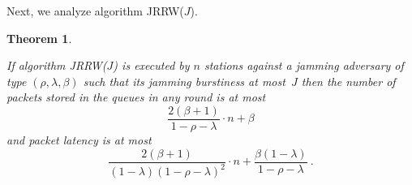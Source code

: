 \documentclass[11pt]{article}
\newtheorem{theorem}{Theorem}
\begin{document}
Next, we analyze algorithm \textsc{JRRW}($J$).


\begin{theorem}
\label{thm:JRRW(J)-jamming}

If algorithm \textsc{JRRW($J$)} is executed by $n$ stations against a jamming adversary of type $(\rho,\lambda,\beta)$ such that its jamming burstiness at most~$J$ then the number of packets stored in the queues in any round is at most
\begin{equation}
\label{eqn:JRRW(J)-jamming-queues}
\frac{2(\beta+1)}{1-\rho-\lambda} \cdot n +\beta
\end{equation}
and packet latency  is  at most 
\begin{equation}
\label{eqn:JRRW(J)-jamming-latency}
\frac{2(\beta+1)}{(1-\lambda)(1-\rho-\lambda)^2} \cdot n + \frac{\beta(1-\lambda)}{1-\rho-\lambda}
\ .
\end{equation}
\end{theorem}
\end{document}
